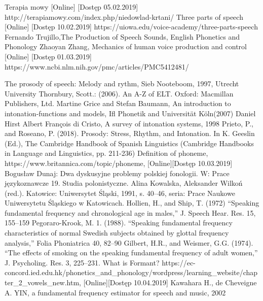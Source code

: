 \documentclass[a4paper,12 pt]{report}
\begin{document}
\begin{thebibliography}{99}
Terapia mowy [Online] [Dostęp 05.02.2019]
http://terapiamowy.com/index.php/niedowlad-krtani/
Three parts of speech [Online] [Dostęp 10.02.2019]
https://uiowa.edu/voice-academy/three-parts-speech
 Fernando Trujillo,The Production of Speech Sounds, English Phonetics and Phonology
Zhaoyan Zhang, Mechanics of human voice production and control [Online] [Dostęp 01.03.2019]
https://www.ncbi.nlm.nih.gov/pmc/articles/PMC5412481/

The prosody of speech: Melody and rythm, Sieb Nooteboom, 1997, Utrecht University
Thornbury, Scott.:
 (2006). An A-Z of ELT. Oxford: Macmillan Publishers, Ltd.
Martine Grice and Stefan Baumann, An introduction to intonation-functions and models, Ifl Phonetik and Universität Köln(2007)
Daniel Hirst Albert François di Cristo, A survey of intonation systems, 1998
Prieto, P., and Roseano, P. (2018). Prosody: Stress, Rhythm, and Intonation. In K. Geeslin (Ed.), The Cambridge Handbook of Spanish Linguistics (Cambridge Handbooks in Language and Linguistics, pp. 211-236)
Definition of phoneme, https://www.britannica.com/topic/phoneme, [Online][Dostęp 10.03.2019]
Bogusław Dunaj: Dwa dyskusyjne problemy polskiej fonologii. W: Prace językoznawcze 19. Studia polonistyczne. Alina Kowalska, Aleksander Wilkoń (red.). Katowice: Uniwersytet Śląski, 1991, s. 40–46, seria: Prace Naukowe Uniwersytetu Śląskiego w Katowicach.
Hollien, H., and Ship, T. (1972) “Speaking fundamental frequency and chronological age in males,” J. Speech Hear. Res. 15, 155–159
Pegoraro-Krook, M. 1. (1988). “Speaking fundamental frequency characteristics of normal Swedish subjects obtained by glottal frequency analysis,” Folia Phoniatrica 40, 82–90
Gilbert, H.R., and Weismer, G.G. (1974). “The effects of smoking on the speaking fundamental frequency of adult women,” J. Psycholing. Res. 3, 225–231. 
What is Formant? https://ec-concord.ied.edu.hk/phonetics\_and\_phonology/wordpress/learning\_website/chapter\_2\_vowels\_new.htm, [Online][Dostęp 10.04.2019]
Kawahara H., de Cheveigne A. YIN, a fundamental frequency estimator for speech and music, 2002

\end{thebibliography}
\end{document}
